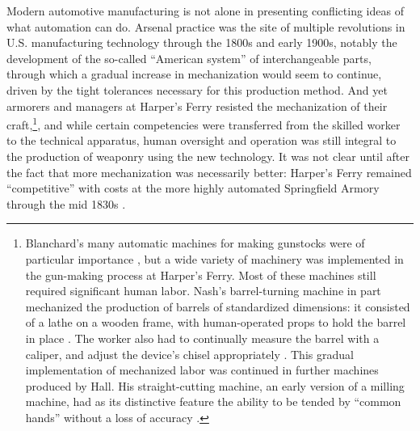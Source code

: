 Modern automotive manufacturing is not alone in presenting conflicting ideas
of what automation can do. Arsenal practice was the site of multiple
revolutions in U.S. 
manufacturing technology through the 1800s and early 1900s, notably
the development of the so-called ``American system'' of interchangeable
parts, through which a gradual increase in mechanization would seem to
continue, driven by the tight tolerances necessary for this production
method. And yet armorers and managers at Harper's Ferry resisted the
mechanization of their craft,\footnote{Blanchard's many automatic
  machines for making gunstocks were of particular
  importance \cite[p. 56]{roesmithHarpers}, but a wide variety of machinery
  was implemented in the gun-making process at Harper's Ferry. Most of
 these machines still required significant human labor. Nash's
 barrel-turning machine in part mechanized the production of barrels
 of standardized dimensions: it consisted of a lathe on a wooden
 frame, with human-operated props to hold the barrel in
 place \cite[p. 119]{roesmithHarpers}. The worker also had to continually
 measure the barrel with a caliper, and adjust the device's chisel
 appropriately \cite[p. 121]{roesmithHarpers}. This gradual implementation of
 mechanized labor was continued in further machines produced by Hall.
 His straight-cutting machine, an early version of a milling machine,
 had as its distinctive feature the ability to be tended by ``common
 hands'' without a loss of
accuracy \cite[p. 239]{roesmithHarpers}.}, and while certain competencies were
transferred from the skilled worker
to the technical apparatus, human oversight and operation was still
integral to the production of weaponry using the new technology. It was
not clear until after the fact that more mechanization was necessarily
better: Harper's Ferry remained ``competitive'' with
costs at the more highly automated Springfield Armory through the mid
1830s \cite[p. 324]{roesmithHarpers}. 

